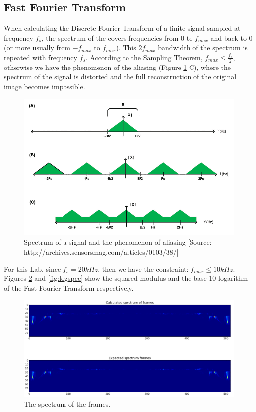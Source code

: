 \documentclass[12pt,a4paper,oneside]{article}
\begin{document}
\subsection{Fast Fourier Transform}
When calculating the Discrete Fourier Transform of a finite signal sampled at frequency $f_s$, the spectrum of the covers frequencies from $0$ to $f_{max}$ and back to $0$ (or more usually from $-f_{max}$ to $f_{max}$). This $2f_{max}$ bandwidth of the spectrum is repeated with frequency $f_s$. According to the Sampling Theorem, $f_{max} \leq \frac{f_s}{2}$, otherwise we have the phenomenon of the aliasing (Figure \ref{fig:alias} C), where the spectrum of the signal is distorted and the full reconstruction of the original image becomes impossible.

\begin{figure}[h]
\centering
\includegraphics[scale=0.5]{fig5_big.png}
\caption{Spectrum of a signal and the phenomenon of aliasing [\scriptsize{Source: http://archives.sensorsmag.com/articles/0103/38/}]}
\label{fig:alias}
\end{figure}

For this Lab, since $f_s = 20kHz$, then we have the constraint: $f_{max} \leq 10kHz$. Figures \ref{fig:spec} and \ref{fig:logspec} show the squared modulus and the base 10 logarithm of the Fast Fourier Transform respectively.

\begin{figure}
\includegraphics[scale=0.4]{../spec.png}
\caption{The spectrum of the frames.}
\label{fig:spec}
\end{figure}
\end{document}
